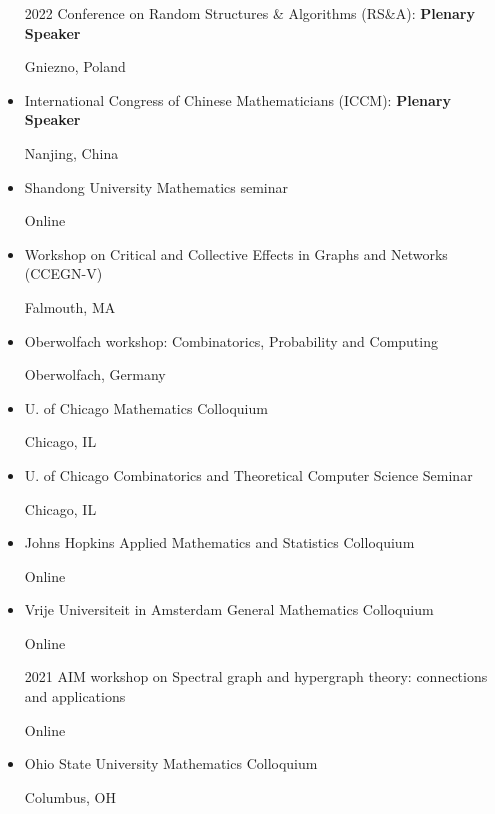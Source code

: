 \documentclass[11pt]{amsart}
\newcommand{\rightloc}[1]{\hfill {\raggedright #1}}
\begin{document}
\begin{itemize}[leftmargin=.4in,itemsep=5pt,topsep=0pt,label={}]



\item[2022]
Conference on Random Structures \& Algorithms (RS\&A): \textbf{Plenary Speaker} \rightloc{Gniezno, Poland}

\item 
International Congress of Chinese Mathematicians (ICCM): \textbf{Plenary Speaker}
\rightloc{Nanjing, China}

\item 
Shandong University Mathematics seminar \rightloc{Online}

\item
Workshop on Critical and Collective Effects in Graphs and Networks (CCEGN-V) \rightloc{Falmouth, MA}

\item Oberwolfach workshop: Combinatorics, Probability and Computing \rightloc{Oberwolfach, Germany}

\item U. of Chicago Mathematics Colloquium
\rightloc{Chicago, IL}

\item U. of Chicago Combinatorics and Theoretical Computer
  Science Seminar
\rightloc{Chicago, IL}

\item Johns Hopkins Applied Mathematics and Statistics Colloquium 
\rightloc{Online}

\item Vrije Universiteit in Amsterdam General Mathematics Colloquium \rightloc{Online}


\item[2021]
AIM workshop on Spectral graph and hypergraph theory: connections and applications
\rightloc{Online}

\item
Ohio State University Mathematics Colloquium
\rightloc{Columbus, OH}


\end{itemize}
\end{document}
